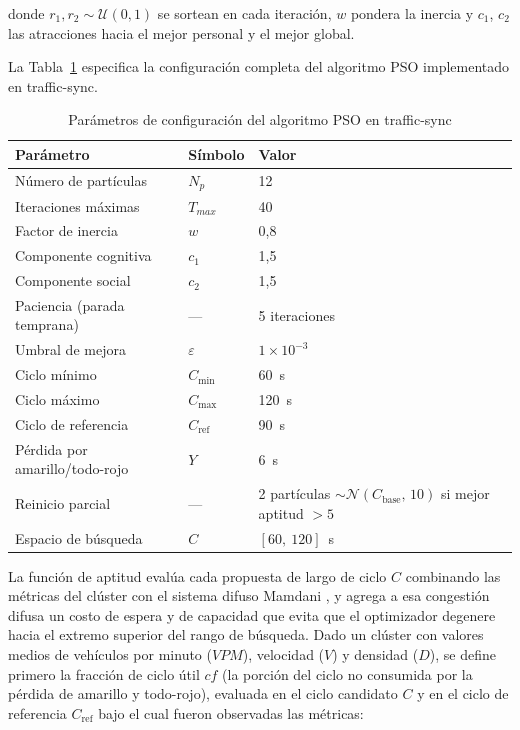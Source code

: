 \noindent donde $r_1, r_2 \sim \mathcal{U}(0,1)$ se sortean en cada iteración, $w$ pondera la
inercia y $c_1$, $c_2$ las atracciones hacia el mejor personal y el mejor global.

La Tabla~\ref{tab:pso_params} especifica la configuración completa del algoritmo PSO
implementado en traffic-sync.

\begin{table}[htbp]
\renewcommand{\arraystretch}{1.25}
\caption{Parámetros de configuración del algoritmo PSO en traffic-sync}
\label{tab:pso_params}
\centering
\footnotesize
\begin{tabular}{lll}
\hline
\textbf{Parámetro} & \textbf{Símbolo} & \textbf{Valor} \\
\hline
Número de partículas      & $N_p$   & 12 \\
Iteraciones máximas       & $T_{max}$ & 40 \\
Factor de inercia         & $w$     & 0,8 \\
Componente cognitiva      & $c_1$   & 1,5 \\
Componente social         & $c_2$   & 1,5 \\
Paciencia (parada temprana) & ---   & 5 iteraciones \\
Umbral de mejora          & $\varepsilon$ & $1 \times 10^{-3}$ \\
Ciclo mínimo              & $C_{\min}$ & 60~s \\
Ciclo máximo              & $C_{\max}$ & 120~s \\
Ciclo de referencia       & $C_{\text{ref}}$ & 90~s \\
Pérdida por amarillo/todo-rojo & $Y$ & 6~s \\
Reinicio parcial          & ---   & 2 partículas $\sim \mathcal{N}(C_{\text{base}},\,10)$ si mejor aptitud $>5$ \\
Espacio de búsqueda       & $C$   & $[60,\ 120]$~s \\
\hline
\end{tabular}
\end{table}

La función de aptitud evalúa cada propuesta de largo de ciclo $C$ combinando las métricas
del clúster con el sistema difuso Mamdani \cite{papageorgiou2003review,stevanovic2010adaptive},
y agrega a esa congestión difusa un costo de espera y de capacidad que evita que el
optimizador degenere hacia el extremo superior del rango de búsqueda. Dado un clúster con
valores medios de vehículos por minuto ($VPM$), velocidad ($V$) y densidad ($D$), se define
primero la fracción de ciclo útil $cf$ (la porción del ciclo no consumida por la pérdida de
amarillo y todo-rojo), evaluada en el ciclo candidato $C$ y en el ciclo de referencia
$C_{\text{ref}}$ bajo el cual fueron observadas las métricas:

